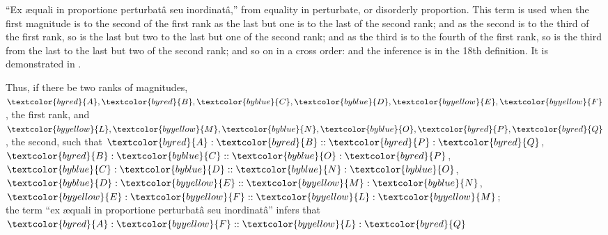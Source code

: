 \documentclass[booklanguage=english]{byrnebook}
\begin{document}
\label{def:V.XX} 
\def\varA{\textcolor{byred}{A}}
\def\varB{\textcolor{byred}{B}}
\def\varC{\textcolor{byblue}{C}}
\def\varD{\textcolor{byblue}{D}}
\def\varE{\textcolor{byyellow}{E}}
\def\varF{\textcolor{byyellow}{F}}
\def\varL{\textcolor{byyellow}{L}}
\def\varM{\textcolor{byyellow}{M}}
\def\varN{\textcolor{byblue}{N}}
\def\varO{\textcolor{byblue}{O}}
\def\varP{\textcolor{byred}{P}}
\def\varQ{\textcolor{byred}{Q}}
\enquote{Ex \ae quali in proportione perturbatâ seu inordinatâ,} from equality in perturbate, or disorderly proportion. This term is used when the first magnitude is to the second of the first rank as the last but one is to the last of the second rank; and as the second is to the third of the first rank, so is the last but two to the last but one of the second rank; and as the third is to the fourth of the first rank, so is the third from the last to the last but two of the second rank; and so on in a cross order: and the inference is in the 18th definition. It is demonstrated in .

\begin{center}
Thus, if there be two ranks of magnitudes,\\
$\varA, \varB, \varC, \varD, \varE, \varF$, the first rank,
and $\varL, \varM, \varN, \varO, \varP, \varQ$, the second,
such that $\varA : \varB :: \varP : \varQ$, $\varB : \varC :: \varO : \varP$, $\varC : \varD :: \varN : \varO$, $\varD : \varE :: \varM : \varN$, $\varE : \varF :: \varL : \varM$;\\
the term \enquote{ex \ae quali in proportione perturbatâ seu inordinatâ} infers that $\varA : \varF :: \varL : \varQ$
\end{center}

\vfill\pagebreak

\label{prop:V.XX}
\end{document}
